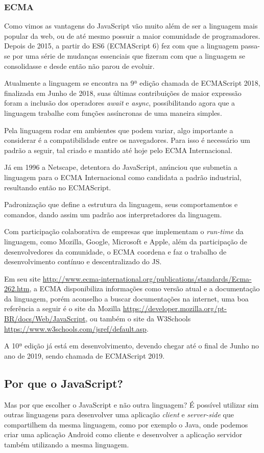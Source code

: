 \documentclass[
	12pt,				%
	openright,			%
	twoside,			%
	a4paper,			%
	english,			%
	brazil				%
	]{abntex2}
\begin{document}
\subsubsection{ECMA}

Como vimos as vantagens do JavaScript vão muito além de ser a linguagem mais popular da web, ou de até mesmo possuir a maior comunidade de programadores. Depois de 2015, a partir do ES6 (ECMAScript 6) fez com que a linguagem passa-se por uma série de mudanças essenciais que fizeram com que a linguagem se consolidasse e desde então não parou de evoluir.

Atualmente a linguagem se encontra na 9ª edição chamada de ECMAScript 2018, finalizada em Junho de 2018, suas últimas contribuições de maior expressão foram a inclusão dos operadores \textit{await} e \textit{async}, possibilitando agora que a linguagem trabalhe com funções assíncronas de uma maneira simples.

Pela linguagem rodar em ambientes que podem variar, algo importante a considerar é a compatibilidade entre os navegadores. Para isso é necessário um padrão a seguir, tal criado e mantido até hoje pelo ECMA Internacional.

Já em 1996 a Netscape, detentora do JavaScript, anúnciou que submetia a linguagem para o ECMA Internacional como candidata a padrão industrial, resultando então no ECMAScript.

Padronização que define a estrutura da linguagem, seus comportamentos e comandos, dando assim um padrão aos interpretadores da linguagem. 

Com participação colaborativa de empresas que implementam o \textit{run-time} da linguagem, como Mozilla, Google, Microsoft e Apple, além da participação de desenvolvedores da comunidade, o ECMA coordena e faz o trabalho de desenvolvimento contínuo e descentralizado do JS.

Em seu site \url{http://www.ecma-international.org/publications/standards/Ecma-262.htm}, a ECMA disponibiliza informações como versão atual e a documentação da linguagem, porém aconselho a buscar documentações na internet, uma boa referência a seguir é o site da Mozilla \url{https://developer.mozilla.org/pt-BR/docs/Web/JavaScript}, ou também o site da W3Schools \url{https://www.w3schools.com/jsref/default.asp}. 

A 10ª edição já está em desenvolvimento, devendo chegar até o final de Junho no ano de 2019, sendo chamada de ECMAScript 2019.

\subsection{Por que o JavaScript?}
Mas por que escolher o JavaScript e não outra linguagem? É possível utilizar sim outras linguagens para desenvolver uma aplicação \textit{client} e \textit{server-side} que compartilhem da mesma linguagem, como por exemplo o Java, onde podemos criar uma aplicação Android como cliente e desenvolver a aplicação servidor também utilizando a mesma linguagem.
\end{document}
